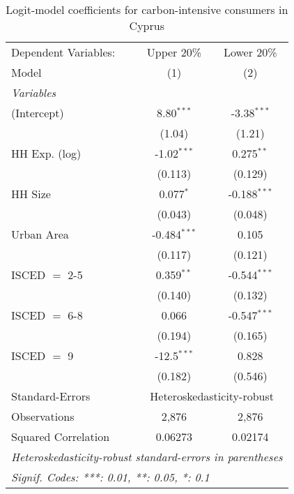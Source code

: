 
\begin{table}[htbp!]
   \centering
   \small
   \begin{adjustbox}{width = 1\textwidth, max height = 0.95\textheight, center}
      \begin{threeparttable}[b]
         \caption{\label{tab:Logit_1_CYP} Logit-model coefficients for carbon-intensive consumers in Cyprus}
         \begin{tabular}{lcc}
            \tabularnewline \midrule \midrule
            Dependent Variables: & Upper 20\%     & Lower 20\%\\   
            Model                & (1)            & (2)\\  
            \midrule
            \emph{Variables}\\
            (Intercept)          & 8.80$^{***}$   & -3.38$^{***}$\\   
                                 & (1.04)         & (1.21)\\   
            HH Exp. (log)        & -1.02$^{***}$  & 0.275$^{**}$\\   
                                 & (0.113)        & (0.129)\\   
            HH Size              & 0.077$^{*}$    & -0.188$^{***}$\\   
                                 & (0.043)        & (0.048)\\   
            Urban Area           & -0.484$^{***}$ & 0.105\\   
                                 & (0.117)        & (0.121)\\   
            ISCED $=$ 2-5        & 0.359$^{**}$   & -0.544$^{***}$\\   
                                 & (0.140)        & (0.132)\\   
            ISCED $=$ 6-8        & 0.066          & -0.547$^{***}$\\   
                                 & (0.194)        & (0.165)\\   
            ISCED $=$ 9          & -12.5$^{***}$  & 0.828\\   
                                 & (0.182)        & (0.546)\\   
            \midrule 
            Standard-Errors & \multicolumn{2}{c}{Heteroskedasticity-robust} \\ 
            Observations         & 2,876          & 2,876\\  
            Squared Correlation  & 0.06273        & 0.02174\\  
            \midrule \midrule
            \multicolumn{3}{l}{\emph{Heteroskedasticity-robust standard-errors in parentheses}}\\
            \multicolumn{3}{l}{\emph{Signif. Codes: ***: 0.01, **: 0.05, *: 0.1}}\\
         \end{tabular}
         

\end{threeparttable}
\end{adjustbox}
\end{table}
